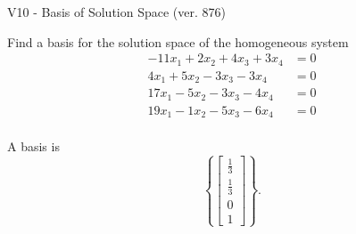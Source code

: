 \begin{exercise}
  \begin{exerciseTitle}V10 - Basis of Solution Space (ver. 876)\end{exerciseTitle}
  \begin{exerciseStatement}
    Find a basis for the solution space of the homogeneous system 
\begin{align*}
 -11 x_ 1 + 2 x_ 2 + 4 x_ 3 + 3 x_ 4 &= 0  \\ 
  4 x_ 1 + 5 x_ 2 -3 x_ 3 -3 x_ 4 &= 0  \\ 
  17 x_ 1 -5 x_ 2 -3 x_ 3 -4 x_ 4 &= 0  \\ 
  19 x_ 1 -1 x_ 2 -5 x_ 3 -6 x_ 4 &= 0  \\ 
 \end{align*}


 
  \end{exerciseStatement}

  \begin{exerciseAnswer}
   A basis is   
\[\left\{\left[\begin{array}{c}
\frac{1}{3} \\
\frac{1}{3} \\
0 \\
1
\end{array}\right]\right\}.\]

  


  \end{exerciseAnswer}
\end{exercise}
